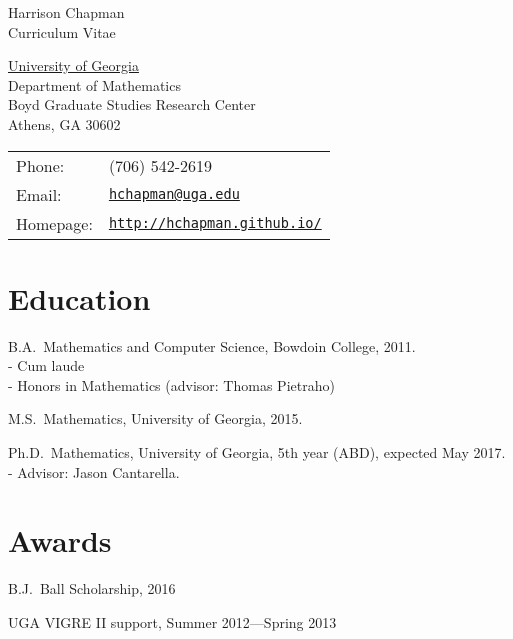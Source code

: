 \documentclass[letterpaper]{article}
\def\name{Harrison Chapman}
\renewenvironment{itemize}{
  \begin{list}{}{
    \setlength{\leftmargin}{1.5em}
  }
}{
  \end{list}
}
\begin{document}
{\huge \name}\\
{\large\sc Curriculum Vitae}


\vspace{0.25in}

\begin{minipage}{0.45\linewidth}
  \href{http://www.uga.edu/}{University of Georgia} \\
  Department of Mathematics \\
  Boyd Graduate Studies Research Center \\
  Athens, GA 30602
\end{minipage}
\begin{minipage}{0.45\linewidth}
  \begin{tabular}{ll}
    Phone: & (706) 542-2619 \\
    Email: & \href{mailto:hchapman@uga.edu}{\tt hchapman@uga.edu} \\
    Homepage: & \href{http://hchapman.github.io/}{\tt http://hchapman.github.io/} \\
  \end{tabular}
\end{minipage}

\section*{Education}

\begin{itemize}
  \item B.A.\ Mathematics and Computer Science, Bowdoin College,
    2011.\\
    - \quad Cum laude \\
    - \quad Honors in Mathematics (advisor: Thomas Pietraho)
  \item M.S.\ Mathematics, University of Georgia, 2015.
  \item Ph.D.\ Mathematics, University of Georgia, 5th year (ABD), expected May
    2017.\\
   - \quad Advisor: Jason Cantarella.
 \end{itemize}

 \section*{Awards}

 \begin{itemize}
 \item B.J.\ Ball Scholarship, 2016
 \item UGA VIGRE II support, Summer 2012---Spring 2013
 \end{itemize}
\end{document}
